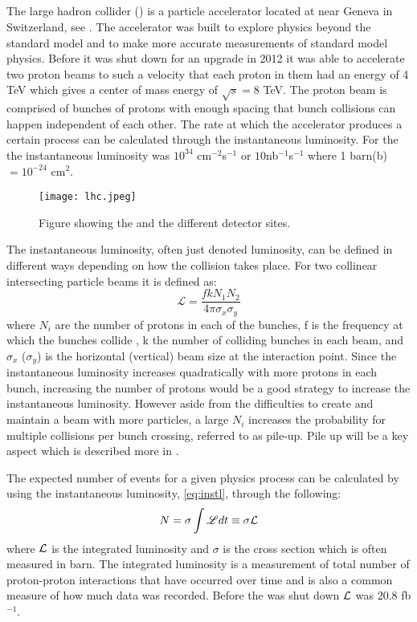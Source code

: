 \subsection{\abbrLHC}
The large hadron collider (\abbrLHC) is a particle accelerator located at \abbrCERN near Geneva in Switzerland, see . The accelerator was built to explore physics beyond the standard model and to make more accurate measurements of standard model physics. Before it was shut down for an upgrade in 2012 it was able to accelerate two proton beams to such a velocity that each proton in them had an energy of 4 TeV which gives a center of mass energy of $\sqrt{s}=8$ TeV. The proton beam is comprised of bunches of protons with enough spacing that bunch collisions can happen independent of each other. The rate at which the accelerator produces a certain process can be calculated through the instantaneous luminosity. For the \abbrLHC the instantaneous luminosity was $10^{34}$ cm$^{-2}$s$^{-1}$ \citep{lumires} or $10$nb$^{-1}$s$^{-1}$ where 1 barn(b)$=10^{-24}$ cm$^2$.
\begin{figure}[H]
\begin{center}
\texttt{[image: lhc.jpeg]}
\caption{Figure showing the \abbrLHC and the different detector sites\citep{lhcimage}.}
\label{fig:lhc}
\end{center}
\end{figure}
The instantaneous luminosity, often just denoted luminosity, can be defined in different ways depending on how the collision takes place. For two collinear intersecting particle beams it is defined as:
\begin{equation}\label{eq:instl}
\mathscr{L} = \frac{fkN_1 N_2}{4\pi \sigma_x \sigma_y}
\end{equation}
where $N_i$ are the number of protons in each of the bunches, f is the frequency at which the bunches collide , k the number of colliding bunches in each beam, and $\sigma_x$ ($\sigma_y$) is the horizontal (vertical) beam size at the interaction point. Since the instantaneous luminosity increases quadratically with more protons in each bunch, increasing the number of protons would be a good strategy to increase the instantaneous luminosity. However aside from the difficulties to create and maintain a beam with more particles, a large $N_i$ increases the probability for multiple collisions per bunch crossing, referred to as pile-up. Pile up will be a key aspect which is described more in . 

The expected number of events for a given physics process can be calculated by using the instantaneous luminosity, \eqref{eq:instl}, through the following:
\begin{equation}\label{eq:Numevents}
N=\sigma \int \mathscr{L} dt \equiv \sigma \mathcal{L}
\end{equation}
where $\mathcal{L}$ is the integrated luminosity and $\sigma$ is the cross section which is often measured in barn.
The integrated luminosity is a measurement of total number of proton-proton interactions that have occurred over time and is also a common measure of how much data was recorded. Before the \abbrLHC was shut down $\mathcal{L}$ was 20.8 fb$^{-1}$.

